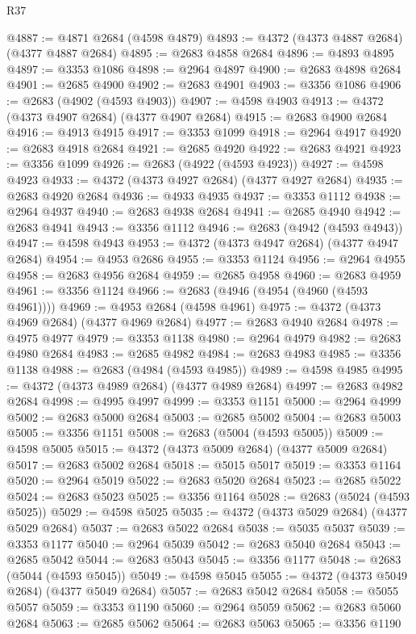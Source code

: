 \begin{lexlean}{R37}
\begin{coremodule}
@4887 := @4871 @2684 (@4598 @4879)
@4893 := @4372 (@4373 @4887 @2684) (@4377 @4887 @2684)
@4895 := @2683 @4858 @2684
@4896 := @4893 @4895
@4897 := @3353 @1086
@4898 := @2964 @4897
@4900 := @2683 @4898 @2684
@4901 := @2685 @4900
@4902 := @2683 @4901
@4903 := @3356 @1086
@4906 := @2683 (@4902 (@4593 @4903))
@4907 := @4598 @4903
@4913 := @4372 (@4373 @4907 @2684) (@4377 @4907 @2684)
@4915 := @2683 @4900 @2684
@4916 := @4913 @4915
@4917 := @3353 @1099
@4918 := @2964 @4917
@4920 := @2683 @4918 @2684
@4921 := @2685 @4920
@4922 := @2683 @4921
@4923 := @3356 @1099
@4926 := @2683 (@4922 (@4593 @4923))
@4927 := @4598 @4923
@4933 := @4372 (@4373 @4927 @2684) (@4377 @4927 @2684)
@4935 := @2683 @4920 @2684
@4936 := @4933 @4935
@4937 := @3353 @1112
@4938 := @2964 @4937
@4940 := @2683 @4938 @2684
@4941 := @2685 @4940
@4942 := @2683 @4941
@4943 := @3356 @1112
@4946 := @2683 (@4942 (@4593 @4943))
@4947 := @4598 @4943
@4953 := @4372 (@4373 @4947 @2684) (@4377 @4947 @2684)
@4954 := @4953 @2686
@4955 := @3353 @1124
@4956 := @2964 @4955
@4958 := @2683 @4956 @2684
@4959 := @2685 @4958
@4960 := @2683 @4959
@4961 := @3356 @1124
@4966 := @2683 (@4946 (@4954 (@4960 (@4593 @4961))))
@4969 := @4953 @2684 (@4598 @4961)
@4975 := @4372 (@4373 @4969 @2684) (@4377 @4969 @2684)
@4977 := @2683 @4940 @2684
@4978 := @4975 @4977
@4979 := @3353 @1138
@4980 := @2964 @4979
@4982 := @2683 @4980 @2684
@4983 := @2685 @4982
@4984 := @2683 @4983
@4985 := @3356 @1138
@4988 := @2683 (@4984 (@4593 @4985))
@4989 := @4598 @4985
@4995 := @4372 (@4373 @4989 @2684) (@4377 @4989 @2684)
@4997 := @2683 @4982 @2684
@4998 := @4995 @4997
@4999 := @3353 @1151
@5000 := @2964 @4999
@5002 := @2683 @5000 @2684
@5003 := @2685 @5002
@5004 := @2683 @5003
@5005 := @3356 @1151
@5008 := @2683 (@5004 (@4593 @5005))
@5009 := @4598 @5005
@5015 := @4372 (@4373 @5009 @2684) (@4377 @5009 @2684)
@5017 := @2683 @5002 @2684
@5018 := @5015 @5017
@5019 := @3353 @1164
@5020 := @2964 @5019
@5022 := @2683 @5020 @2684
@5023 := @2685 @5022
@5024 := @2683 @5023
@5025 := @3356 @1164
@5028 := @2683 (@5024 (@4593 @5025))
@5029 := @4598 @5025
@5035 := @4372 (@4373 @5029 @2684) (@4377 @5029 @2684)
@5037 := @2683 @5022 @2684
@5038 := @5035 @5037
@5039 := @3353 @1177
@5040 := @2964 @5039
@5042 := @2683 @5040 @2684
@5043 := @2685 @5042
@5044 := @2683 @5043
@5045 := @3356 @1177
@5048 := @2683 (@5044 (@4593 @5045))
@5049 := @4598 @5045
@5055 := @4372 (@4373 @5049 @2684) (@4377 @5049 @2684)
@5057 := @2683 @5042 @2684
@5058 := @5055 @5057
@5059 := @3353 @1190
@5060 := @2964 @5059
@5062 := @2683 @5060 @2684
@5063 := @2685 @5062
@5064 := @2683 @5063
@5065 := @3356 @1190

\end{coremodule}
\end{lexlean}
